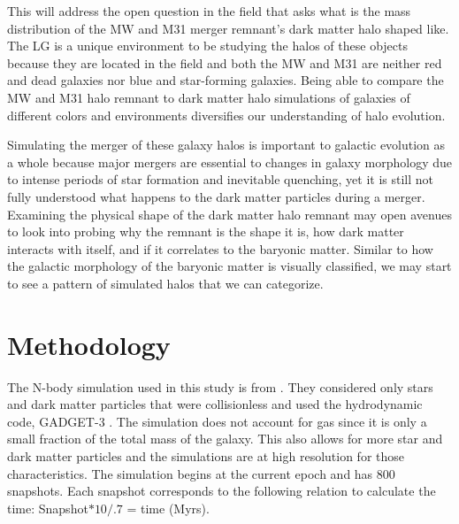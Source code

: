 \documentclass[linenumbers, twocolumn]{aastex631}
\begin{document}
This will address the open question in the field that asks what is the mass distribution of the MW and M31 merger remnant's dark matter halo shaped like. The LG is a unique environment to be studying the halos of these objects because they are located in the field and both the MW and M31 are neither red and dead galaxies nor blue and star-forming galaxies. Being able to compare the MW and M31 halo remnant to dark matter halo simulations of galaxies of different colors and environments diversifies our understanding of halo evolution.



Simulating the merger of these galaxy halos is important to galactic evolution as a whole because major mergers are essential to changes in galaxy morphology due to intense periods of star formation and inevitable quenching, yet it is still not fully understood what happens to the dark matter particles during a merger. Examining the physical shape of the dark matter halo remnant may open avenues to look into probing why the remnant is the shape it is, how dark matter interacts with itself, and if it correlates to the baryonic matter. Similar to how the galactic morphology of the baryonic matter is visually classified, we may start to see a pattern of simulated halos that we can categorize.



\section{Methodology} \label{sec:methodology}

The N-body simulation used in this study is from \cite{2012VanDerMarel}. They considered only stars and dark matter particles that were collisionless and used the hydrodynamic code, GADGET-3 \cite{}. The simulation does not account for gas since it is only a small fraction of the total mass of the galaxy. This also allows for more star and dark matter particles and the simulations are at high resolution for those characteristics. The simulation begins at the current epoch and has 800 snapshots. Each snapshot corresponds to the following relation to calculate the time: Snapshot$*10/.7$ = time (Myrs).
\end{document}
